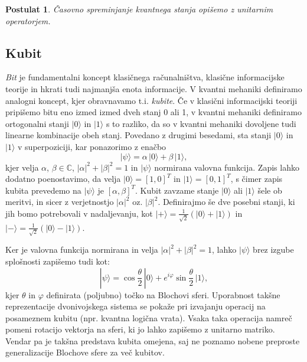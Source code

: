 \documentclass[12pt]{article}
\newtheorem{postulat}{Postulat}
\begin{document}
\begin{postulat}
Časovno spreminjanje kvantnega stanja opišemo z unitarnim operatorjem.
\end{postulat}


\subsection{Kubit}
\label{kubit} 

\emph{Bit} je fundamentalni koncept klasičnega računalništva, klasične informacijske teorije in hkrati tudi najmanjša enota informacije. V kvantni mehaniki definiramo analogni koncept, kjer obravnavamo t.i. \emph{kubite}. Če v klasični informacijski teoriji pripišemo bitu eno izmed izmed dveh stanj 0 ali 1, v kvantni mehaniki definiramo ortogonalni stanji $| 0 \rangle$ in $| 1 \rangle$ s to razliko, da so v kvantni mehaniki dovoljene tudi linearne kombinacije obeh stanj. Povedano z drugimi besedami, sta stanji $| 0 \rangle$ in $| 1 \rangle$ v superpoziciji, kar ponazorimo z enačbo
%
\begin{equation}
| \psi \rangle = \alpha \, | 0 \rangle + \beta \, | 1 \rangle,
\end{equation}
%
kjer velja $\alpha$, $\beta \in \mathbb{C}$, $|\alpha|^2 + |\beta|^2 = 1$ in $| \psi \rangle$ normirana valovna funkcija. Zapis lahko dodatno poenostavimo, da velja $| 0 \rangle = [1,0]^T$ in $| 1 \rangle = [0,1]^T$, s čimer zapis kubita prevedemo na $| \psi \rangle$ je $[\alpha, \beta]^T$.  Kubit zavzame stanje $| 0 \rangle$ ali $| 1 \rangle$ šele ob meritvi, in sicer z verjetnostjo $|\alpha|^2$ oz. $|\beta|^2$. Definirajmo še dve posebni stanji, ki jih bomo potrebovali v nadaljevanju, kot $| + \rangle = \frac{1}{\sqrt{2}}(|0\rangle + |1\rangle)$ in $| - \rangle = \frac{1}{\sqrt{2}}(|0\rangle - |1\rangle)$. \cite{nielsenQuantumComputationQuantum2012} \par Ker je valovna funkcija normirana in velja $|\alpha|^2 + |\beta|^2 = 1$, lahko $| \psi \rangle$ brez izgube splošnosti zapišemo tudi kot:
\begin{equation}
\label{blocheq}
| \psi \rangle = \cos{\frac{\theta}{2}} \, | 0 \rangle + e^{i \varphi} \sin{\frac{\theta}{2}} \, | 1 \rangle,
\end{equation}
kjer $\theta$ in $\varphi$ definirata (poljubno) točko na Blochovi sferi. Uporabnost takšne reprezentacije dvonivojskega sistema se pokaže pri izvajanju operacij na posameznem kubitu (npr. kvantna logična vrata). Vsaka taka operacija namreč pomeni rotacijo vektorja na sferi, ki jo lahko zapišemo z unitarno matriko. Vendar pa je takšna predstava kubita omejena, saj ne poznamo nobene preproste generalizacije Blochove sfere za več kubitov. \cite{nielsenQuantumComputationQuantum2012}
\end{document}
